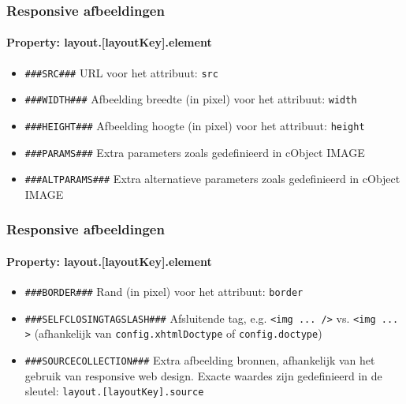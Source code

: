 \begin{frame}[fragile]
	\frametitle{Responsive afbeeldingen}
	\framesubtitle{Property: layout.[layoutKey].element}


	\begin{itemize}
			\item \lstinline!###SRC###!\newline
				URL voor het attribuut: \texttt{src}

			\item \lstinline!###WIDTH###!\newline
				Afbeelding breedte (in pixel) voor het attribuut: \texttt{width}

			\item \lstinline!###HEIGHT###!\newline
				Afbeelding hoogte (in pixel) voor het attribuut: \texttt{height}

			\item \lstinline!###PARAMS###!\newline
				Extra parameters zoals gedefinieerd in cObject IMAGE

			\item \lstinline!###ALTPARAMS###!\newline
				Extra alternatieve parameters zoals gedefinieerd in cObject IMAGE

	\end{itemize}

\end{frame}


\begin{frame}[fragile]
	\frametitle{Responsive afbeeldingen}
	\framesubtitle{Property: layout.[layoutKey].element}

		\begin{itemize}
			\item \lstinline!###BORDER###!\newline
				Rand (in pixel) voor het attribuut: \texttt{border}

			\item \lstinline!###SELFCLOSINGTAGSLASH###!\newline
				Afsluitende tag, e.g. \texttt{<img ... />} vs. \texttt{<img ... >}\newline
				(afhankelijk van \texttt{config.xhtmlDoctype} of \texttt{config.doctype})

			\item \lstinline!###SOURCECOLLECTION###!\newline
				Extra afbeelding bronnen, afhankelijk van het gebruik van responsive web design.
				Exacte waardes zijn gedefinieerd in de sleutel: \texttt{layout.[layoutKey].source}

	\end{itemize}

\end{frame}

